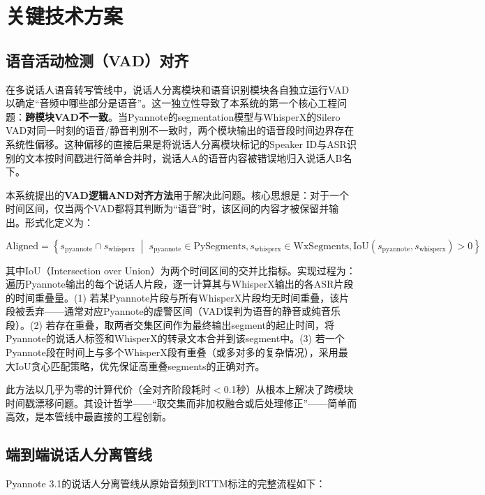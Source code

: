 \documentclass[12pt, a4paper]{article}
\begin{document}
\section{关键技术方案}

\subsection{语音活动检测（VAD）对齐}

在多说话人语音转写管线中，说话人分离模块和语音识别模块各自独立运行VAD以确定``音频中哪些部分是语音''。这一独立性导致了本系统的第一个核心工程问题：\textbf{跨模块VAD不一致}。当Pyannote的segmentation模型与WhisperX的Silero VAD对同一时刻的语音/静音判别不一致时，两个模块输出的语音段时间边界存在系统性偏移。这种偏移的直接后果是将说话人分离模块标记的Speaker ID与ASR识别的文本按时间戳进行简单合并时，说话人A的语音内容被错误地归入说话人B名下。

本系统提出的\textbf{VAD逻辑AND对齐方法}用于解决此问题。核心思想是：对于一个时间区间，仅当两个VAD都将其判断为``语音''时，该区间的内容才被保留并输出。形式化定义为：

\begin{equation}
\text{Aligned} = \left\{s_{\text{pyannote}} \cap s_{\text{whisperx}} \;\middle|\; s_{\text{pyannote}} \in \text{PySegments}, s_{\text{whisperx}} \in \text{WxSegments}, \text{IoU}(s_{\text{pyannote}}, s_{\text{whisperx}}) > 0\right\}
\end{equation}

其中IoU（Intersection over Union）为两个时间区间的交并比指标。实现过程为：遍历Pyannote输出的每个说话人片段，逐一计算其与WhisperX输出的各ASR片段的时间重叠量。(1) 若某Pyannote片段与所有WhisperX片段均无时间重叠，该片段被丢弃——通常对应Pyannote的虚警区间（VAD误判为语音的静音或纯音乐段）。(2) 若存在重叠，取两者交集区间作为最终输出segment的起止时间，将Pyannote的说话人标签和WhisperX的转录文本合并到该segment中。(3) 若一个Pyannote段在时间上与多个WhisperX段有重叠（或多对多的复杂情况），采用最大IoU贪心匹配策略，优先保证高重叠segments的正确对齐。

此方法以几乎为零的计算代价（全对齐阶段耗时$<$0.1秒）从根本上解决了跨模块时间戳漂移问题。其设计哲学——``取交集而非加权融合或后处理修正''——简单而高效，是本管线中最直接的工程创新。

\subsection{端到端说话人分离管线}

Pyannote 3.1的说话人分离管线从原始音频到RTTM标注的完整流程如下：
\end{document}

